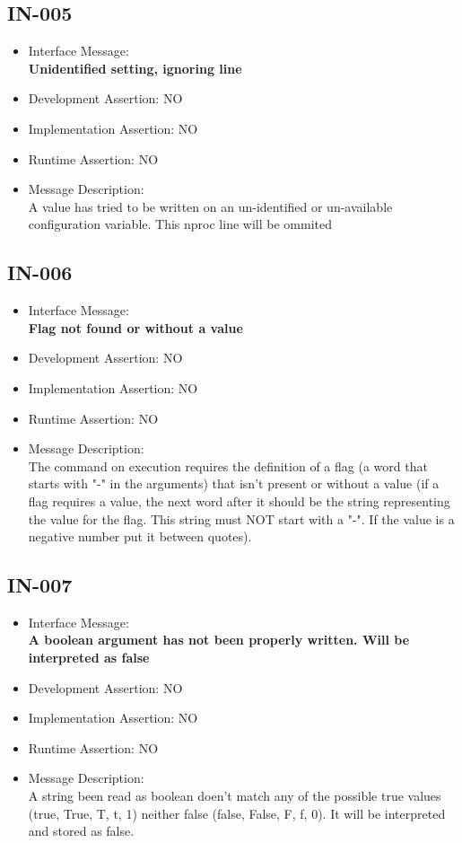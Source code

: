 \subsection{IN-005}
\begin{itemize}
  \item Interface Message:\\[1em]
    \textbf{Unidentified setting, ignoring line}
  \item Development Assertion: NO
  \item Implementation Assertion: NO
  \item Runtime Assertion: NO
  \item Message Description:\\[1em]
    A value has tried to be written on an un-identified or un-available configuration variable. This nproc line will be ommited
\end{itemize}

\subsection{IN-006}
\begin{itemize}
  \item Interface Message:\\[1em]
    \textbf{Flag not found or without a value}
  \item Development Assertion: NO
  \item Implementation Assertion: NO
  \item Runtime Assertion: NO
  \item Message Description:\\[1em]
    The command on execution requires the definition of a flag (a word that starts with "-" in the arguments) that isn't present or without a value (if a flag requires a value, the next word after it should be the string representing the value for the flag. This string must NOT start with a "-". If the value is a negative number put it between quotes).
\end{itemize}

\subsection{IN-007}
\begin{itemize}
  \item Interface Message:\\[1em]
    \textbf{A boolean argument has not been properly written. Will be interpreted as false}
  \item Development Assertion: NO
  \item Implementation Assertion: NO
  \item Runtime Assertion: NO
  \item Message Description:\\[1em]
    A string been read as boolean doen't match any of the possible true values (true, True, T, t, 1) neither false (false, False, F, f, 0). It will be interpreted and stored as false.
\end{itemize}

